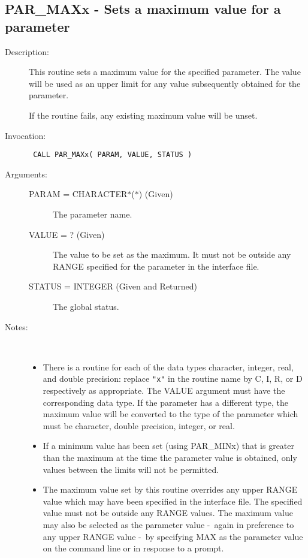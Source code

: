 \documentclass[twoside,11pt]{article}
\newcommand{\xlabel}[1]{}
\newcommand{\dash}{--}
\renewcommand{\dash}{-}
\newlength{\sstbannerlength}
\newlength{\sstcaptionlength}
\newlength{\sstexampleslength}
\newlength{\sstexampleswidth}
\newcommand{\sstroutine}[3]{
   \goodbreak
   \rule{\textwidth}{0.5mm}
   \vspace{-7ex}
   \newline
   \settowidth{\sstbannerlength}{{\Large {\bf #1}}}
   \setlength{\sstcaptionlength}{\textwidth}
   \setlength{\sstexampleslength}{\textwidth}
   \addtolength{\sstbannerlength}{0.5em}
   \addtolength{\sstcaptionlength}{-2.0\sstbannerlength}
   \addtolength{\sstcaptionlength}{-5.0pt}
   \settowidth{\sstexampleswidth}{{\bf Examples:}}
   \addtolength{\sstexampleslength}{-\sstexampleswidth}
   \parbox[t]{\sstbannerlength}{\flushleft{\Large {\bf #1}}}
   \parbox[t]{\sstcaptionlength}{\center{\Large #2}}
   \parbox[t]{\sstbannerlength}{\flushright{\Large {\bf #1}}}
   \begin{description}
      #3
   \end{description}
}
\newcommand{\sstdescription}[1]{\item[Description:] #1}
\newcommand{\sstinvocation}[1]{\item[Invocation:]\hspace{0.4em}{\tt #1}}
\newcommand{\sstarguments}[1]{
   \item[Arguments:] \mbox{} \\
   \vspace{-3.5ex}
   \begin{description}
      #1
   \end{description}
}
\newcommand{\sstsubsection}[1]{ \item[{#1}] \mbox{} \\}
\newcommand{\sstnotes}[1]{\item[Notes:] \mbox{} \\[1.3ex] #1}
\newcommand{\sstitemlist}[1]{
  \mbox{} \\
  \vspace{-7ex}
  \begin{itemize}
     #1
  \end{itemize}
}
\newcommand{\sstitem}{\item}
\newcommand{\ssttt}{\tt}
\renewcommand{\sstroutine}[3]{
      \subsection{\xlabel{12}#1\xlabel{#1}-\label{#1}#2}
      \begin{description}
         #3
      \end{description}
   }
\renewcommand{\sstdescription}[1]{\item[Description:]
      \begin{description}
         #1
      \end{description}
   }
\renewcommand{\sstinvocation}[1]{\item[Invocation:]
      \begin{description}
         {\ssttt #1}
      \end{description}
   }
\renewcommand{\sstarguments}[1]{
      \item[Arguments:]
      \begin{description}
         #1
      \end{description}
   }
\renewcommand{\sstsubsection}[1]{\item[{#1}]}
\renewcommand{\sstnotes}[1]{\item[Notes:]
      \begin{description}
         #1
      \end{description}
   }
\newcommand{\sstitemlist}[1]{
      \begin{itemize}
         #1
      \end{itemize}
   }
\begin{document}
\sstroutine{
   PAR\_MAXx
}{
   Sets a maximum value for a parameter
}{
   \sstdescription{
      This routine sets a maximum value for the specified parameter.
      The value will be used as an upper limit for any value
      subsequently obtained for the parameter.

      If the routine fails, any existing maximum value will be unset.
   }
   \sstinvocation{
      CALL PAR\_MAXx( PARAM, VALUE, STATUS )
   }
   \sstarguments{
      \sstsubsection{
         PARAM = CHARACTER$*$($*$) (Given)
      }{
         The parameter name.
      }
      \sstsubsection{
         VALUE = ? (Given)
      }{
         The value to be set as the maximum.  It must not be outside
         any RANGE specified for the parameter in the interface file.
      }
      \sstsubsection{
         STATUS = INTEGER (Given and Returned)
      }{
         The global status.
      }
   }
   \sstnotes{
      \sstitemlist{

         \sstitem
         There is a routine for each of the data types character,
         integer, real, and double precision: replace {\tt "x"} in the routine
         name by C, I, R, or D respectively as appropriate.  The VALUE
         argument must have the corresponding data type.  If the parameter
         has a different type, the maximum value will be converted to the
         type of the parameter which must be character, double precision,
         integer, or real.

         \sstitem
         If a minimum value has been set (using PAR\_MINx) that is
         greater than the maximum at the time the parameter value is
         obtained, only values between the limits will not be permitted.

         \sstitem
         The maximum value set by this routine overrides any upper
         RANGE value which may have been specified in the interface file.
         The specified value must not be outside any RANGE values.  The
         maximum value may also be selected as the parameter value \dash\ again
         in preference to any upper RANGE value \dash\ by specifying MAX as the
         parameter value on the command line or in response to a prompt.
      }
   }
}
\end{document}
